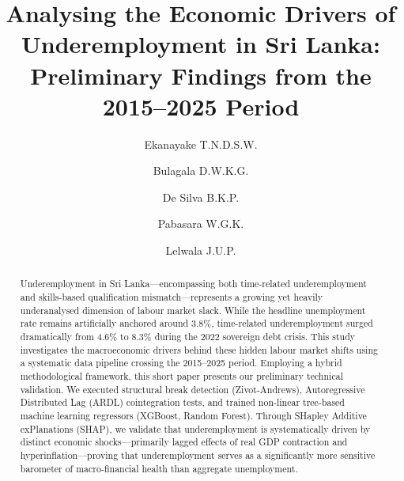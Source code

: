 \documentclass[sigconf]{acmart}
\begin{document}
\title{Analysing the Economic Drivers of Underemployment in Sri Lanka: Preliminary Findings from the 2015--2025 Period}

\author{Ekanayake T.N.D.S.W.}

\author{Bulagala D.W.K.G.}

\author{De Silva B.K.P.}

\author{Pabasara W.G.K.}

\author{Lelwala J.U.P.}

\begin{abstract}
Underemployment in Sri Lanka---encompassing both time-related underemployment and skills-based qualification mismatch---represents a growing yet heavily underanalysed dimension of labour market slack. While the headline unemployment rate remains artificially anchored around 3.8\%, time-related underemployment surged dramatically from 4.6\% to 8.3\% during the 2022 sovereign debt crisis. This study investigates the macroeconomic drivers behind these hidden labour market shifts using a systematic data pipeline crossing the 2015--2025 period. Employing a hybrid methodological framework, this short paper presents our preliminary technical validation. We executed structural break detection (Zivot-Andrews), Autoregressive Distributed Lag (ARDL) cointegration tests, and trained non-linear tree-based machine learning regressors (XGBoost, Random Forest). Through SHapley Additive exPlanations (SHAP), we validate that underemployment is systematically driven by distinct economic shocks—primarily lagged effects of real GDP contraction and hyperinflation—proving that underemployment serves as a significantly more sensitive barometer of macro-financial health than aggregate unemployment.
\end{abstract}

\end{document}
